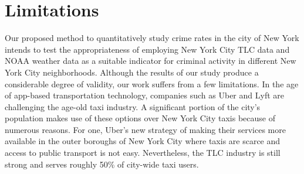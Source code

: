 \documentclass{sigkddExp}
\begin{document}
\section{Limitations}
Our proposed method to quantitatively study crime rates in the city of New York intends to test the appropriateness of employing New York City TLC data and NOAA weather data as a suitable indicator for criminal activity in different New York City neighborhoods. Although the results of our study produce a considerable degree of validity, our work suffers from a few limitations. 
In the age of app-based transportation technology, companies such as Uber and Lyft are challenging the age-old taxi industry. 
A significant portion of the city's population makes use of these options over New York City taxis because of numerous reasons. 
For one, Uber's new strategy of making their services more available in the outer boroughs of New York City where taxis are scarce and access to public transport is not easy. Nevertheless, the TLC industry is still strong and serves roughly 50\% of city-wide taxi users.






\end{document}

